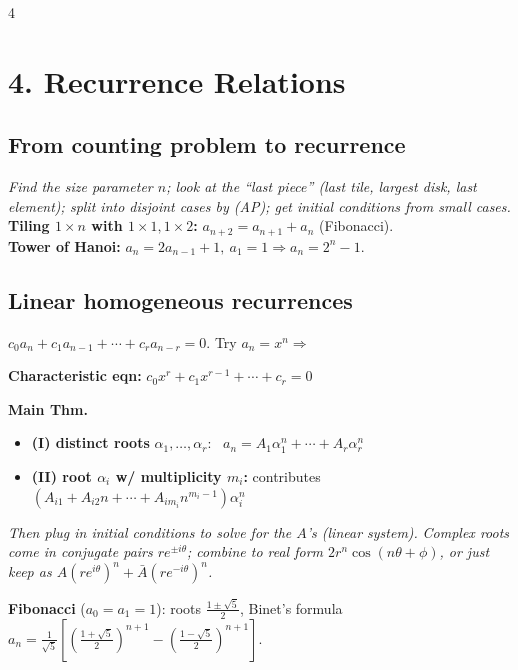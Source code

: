 \documentclass[8pt]{extarticle}
\newcommand{\note}[1]{{\footnotesize\color{gray!70!black}\emph{#1}}}
\begin{document}
\begin{multicols}{4}
\columnbreak
\section{4. Recurrence Relations}

\subsection*{From counting problem to recurrence}
\note{Find the size parameter $n$; look at the ``last piece'' (last tile, largest disk, last element); split into disjoint cases by (AP); get initial conditions from small cases.}
\textbf{Tiling $1\times n$ with $1\times1,1\times2$:} $a_{n+2}=a_{n+1}+a_n$ (Fibonacci).\\
\textbf{Tower of Hanoi:} $a_n=2a_{n-1}+1,\ a_1=1 \Rightarrow a_n=2^n-1$.

\subsection*{Linear homogeneous recurrences}
$c_0a_n+c_1a_{n-1}+\cdots+c_ra_{n-r}=0$. Try $a_n=x^n\Rightarrow$
\begin{key}
\textbf{Characteristic eqn:} $c_0x^r+c_1x^{r-1}+\cdots+c_r=0$
\end{key}
\textbf{Main Thm.}
\begin{itemize}
\item \textbf{(I) distinct roots} $\alpha_1,\dots,\alpha_r$: \ $a_n=A_1\alpha_1^n+\cdots+A_r\alpha_r^n$
\item \textbf{(II) root $\alpha_i$ w/ multiplicity $m_i$:} contributes $(A_{i1}+A_{i2}n+\cdots+A_{im_i}n^{m_i-1})\alpha_i^n$
\end{itemize}
\note{Then plug in initial conditions to solve for the $A$'s (linear system).}
\note{Complex roots come in conjugate pairs $re^{\pm i\theta}$; combine to real form $2r^n\cos(n\theta+\phi)$, or just keep as $A(re^{i\theta})^n+\bar A(re^{-i\theta})^n$.}

\textbf{Fibonacci} ($a_0=a_1=1$): roots $\frac{1\pm\sqrt5}2$, Binet's formula
$a_n=\frac1{\sqrt5}\!\left[\left(\frac{1+\sqrt5}2\right)^{n+1}\!\!-\left(\frac{1-\sqrt5}2\right)^{n+1}\right]$.


\end{multicols}
\end{document}
